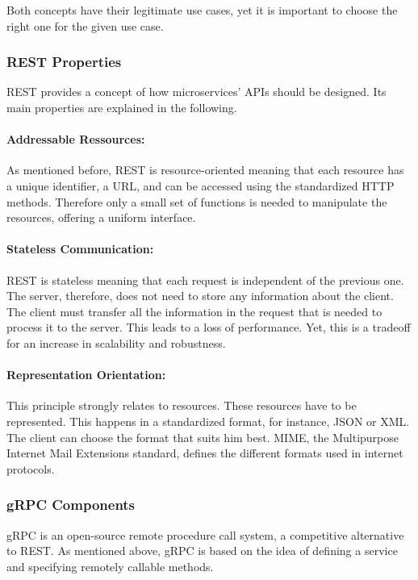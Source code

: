 Both concepts have their legitimate use cases, yet it is important to choose the right one for the given use case.

\subsubsection*{REST Properties}
REST provides a concept of how microservices' APIs should be designed.
Its main properties are explained in the following.

\paragraph*{Addressable Ressources:}
As mentioned before, REST is resource-oriented meaning that each resource has a unique identifier, a URL, and can be accessed using the standardized HTTP methods.
Therefore only a small set of functions is needed to manipulate the resources, offering a uniform interface.

\paragraph*{Stateless Communication:}
REST is stateless meaning that each request is independent of the previous one.
The server, therefore, does not need to store any information about the client.
The client must transfer all the information in the request that is needed to process it to the server.
This leads to a loss of performance.
Yet, this is a tradeoff for an increase in scalability and robustness.

\paragraph*{Representation Orientation:}
This principle strongly relates to resources.
These resources have to be represented.
This happens in a standardized format, for instance, JSON or XML.
The client can choose the format that suits him best.
MIME, the Multipurpose Internet Mail Extensions standard, defines the different formats used in internet protocols.

\subsubsection*{gRPC Components}
gRPC is an open-source remote procedure call system, a competitive alternative to REST.
As mentioned above, gRPC is based on the idea of defining a service and specifying remotely callable methods.

